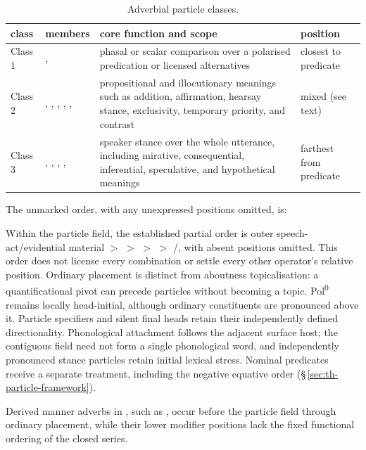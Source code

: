 \begin{table}[ht]
	\footnotesize
	\caption{Adverbial particle classes.}\label{tab:adv-particle-classes}
	\begin{tabularx}{\textwidth}{l L L l}
		\toprule
		{\sc class} & {\sc members} & {\sc core function and scope} & {\sc position} \\
		\midrule
		Class 1 &
		,  &
		phasal or scalar comparison over a polarised predication or licensed alternatives &
		closest to predicate \\
		Class 2 &
		, , , , ,  &
		propositional and illocutionary meanings such as addition, affirmation, hearsay stance, exclusivity, temporary priority, and contrast &
		mixed (see text) \\
		Class 3 &
		, , , ,  &
		speaker stance over the whole utterance, including mirative, consequential, inferential, speculative, and hypothetical meanings &
		farthest from predicate \\
		\bottomrule
	\end{tabularx}
\end{table}

The unmarked order, with any unexpressed positions omitted, is:

\pex
\a {}
\xe

\noindent Within the particle field, the established partial order is
outer speech-act/evidential material $>$  $>$  $>$
 $>$ /, with absent positions omitted.
This order does not license every combination or settle every other operator's
relative position. Ordinary placement is distinct from aboutness topicalisation:
a quantificational pivot can precede particles without becoming a topic.
Pol\textsuperscript{0} remains locally head-initial, although ordinary
constituents are pronounced above it. Particle specifiers and silent final
heads retain their independently defined directionality. Phonological
attachment follows the adjacent surface host; the contiguous field need not
form a single phonological word, and independently pronounced stance particles
retain initial lexical stress. Nominal predicates receive a separate treatment,
including the negative equative order 
(§\,\ref{sec:th-particle-framework}).

Derived manner adverbs in , such as  ,
occur before the particle field through ordinary placement, while their lower
modifier positions lack the fixed functional ordering of the closed series.

